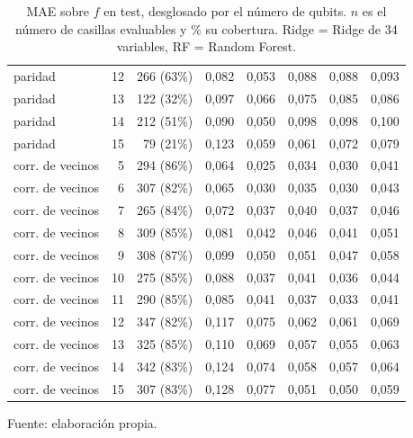 \begin{table}[htbp]
{\begin{tabular}{@{}lrrrrrrr@{}}
        paridad & 12 & 266 (63\%) & 0,082 & 0,053 & 0,088 & 0,088 & 0,093 \\
        paridad & 13 & 122 (32\%) & 0,097 & 0,066 & 0,075 & 0,085 & 0,086 \\
        paridad & 14 & 212 (51\%) & 0,090 & 0,050 & 0,098 & 0,098 & 0,100 \\
        paridad & 15 & 79 (21\%) & 0,123 & 0,059 & 0,061 & 0,072 & 0,079 \\
        corr. de vecinos & 5 & 294 (86\%) & 0,064 & 0,025 & 0,034 & 0,030 & 0,041 \\
        corr. de vecinos & 6 & 307 (82\%) & 0,065 & 0,030 & 0,035 & 0,030 & 0,043 \\
        corr. de vecinos & 7 & 265 (84\%) & 0,072 & 0,037 & 0,040 & 0,037 & 0,046 \\
        corr. de vecinos & 8 & 309 (85\%) & 0,081 & 0,042 & 0,046 & 0,041 & 0,051 \\
        corr. de vecinos & 9 & 308 (87\%) & 0,099 & 0,050 & 0,051 & 0,047 & 0,058 \\
        corr. de vecinos & 10 & 275 (85\%) & 0,088 & 0,037 & 0,041 & 0,036 & 0,044 \\
        corr. de vecinos & 11 & 290 (85\%) & 0,085 & 0,041 & 0,037 & 0,033 & 0,041 \\
        corr. de vecinos & 12 & 347 (82\%) & 0,117 & 0,075 & 0,062 & 0,061 & 0,069 \\
        corr. de vecinos & 13 & 325 (85\%) & 0,110 & 0,069 & 0,057 & 0,055 & 0,063 \\
        corr. de vecinos & 14 & 342 (83\%) & 0,124 & 0,074 & 0,058 & 0,057 & 0,064 \\
        corr. de vecinos & 15 & 307 (83\%) & 0,128 & 0,077 & 0,051 & 0,050 & 0,059 \\
        \bottomrule
    \end{tabular}}

    \caption{MAE sobre $f$ en test, desglosado por el número de qubits. $n$ es el número de casillas evaluables y \% su cobertura. Ridge = Ridge de 34 variables, RF = Random Forest.}
    \label{tab:v3_tamano_mae}

    {\footnotesize Fuente: elaboración propia.}
\end{table}
